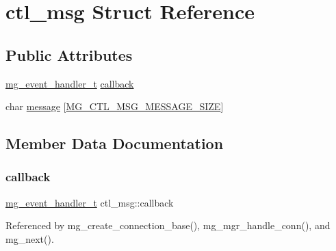 \hypertarget{structctl__msg}{}\section{ctl\+\_\+msg Struct Reference}
\label{structctl__msg}
\subsection*{Public Attributes}
\begin{DoxyCompactItemize}
\item 
\hyperlink{mongoose_8h_ae5a76da37b3496fcdf561e51648eabda_ae5a76da37b3496fcdf561e51648eabda}{mg\+\_\+event\+\_\+handler\+\_\+t} \hyperlink{structctl__msg_a62d9f57eca85bcecf123ae9046d97972_a62d9f57eca85bcecf123ae9046d97972}{callback}
\item 
char \hyperlink{structctl__msg_a07e117d1bf333976cd03507b0c1538b0_a07e117d1bf333976cd03507b0c1538b0}{message} \mbox{[}\hyperlink{mongoose_8c_a50aa6b3695b446ad4b8c77bbd0115c94_a50aa6b3695b446ad4b8c77bbd0115c94}{M\+G\+\_\+\+C\+T\+L\+\_\+\+M\+S\+G\+\_\+\+M\+E\+S\+S\+A\+G\+E\+\_\+\+S\+I\+ZE}\mbox{]}
\end{DoxyCompactItemize}


\subsection{Member Data Documentation}
\mbox{\label{structctl__msg_a62d9f57eca85bcecf123ae9046d97972_a62d9f57eca85bcecf123ae9046d97972}} 
\subsubsection{\texorpdfstring{callback}{callback}}
{\footnotesize\ttfamily \hyperlink{mongoose_8h_ae5a76da37b3496fcdf561e51648eabda_ae5a76da37b3496fcdf561e51648eabda}{mg\+\_\+event\+\_\+handler\+\_\+t} ctl\+\_\+msg\+::callback}



Referenced by mg\+\_\+create\+\_\+connection\+\_\+base(), mg\+\_\+mgr\+\_\+handle\+\_\+conn(), and mg\+\_\+next().

\mbox{\label{structctl__msg_a07e117d1bf333976cd03507b0c1538b0_a07e117d1bf333976cd03507b0c1538b0}} 
